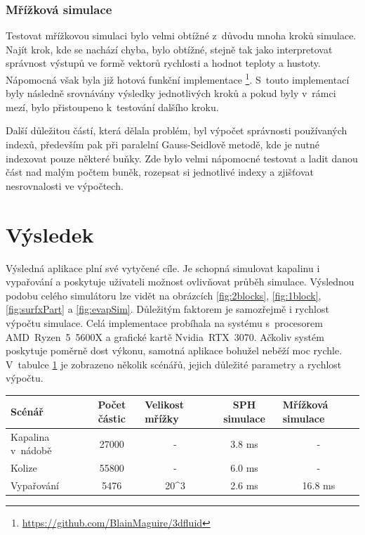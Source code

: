 \subsubsection{Mřížková simulace}
Testovat mřížkovou simulaci bylo velmi obtížné z~důvodu mnoha kroků simulace. Najít krok, kde se nachází chyba, bylo obtížné, stejně tak jako interpretovat správnost výstupů ve formě vektorů rychlosti a hodnot teploty a hustoty. Nápomocná však byla již hotová funkční implementace \footnote{\url{https://github.com/BlainMaguire/3dfluid}}. S~touto implementací byly následně srovnávány výsledky jednotlivých kroků a pokud byly v~rámci mezí, bylo přistoupeno k~testování dalšího kroku.

Další důležitou částí, která dělala problém, byl výpočet správnosti používaných indexů, především pak při paralelní Gauss-Seidlově metodě, kde je nutné indexovat pouze některé buňky. Zde bylo velmi nápomocné testovat a ladit danou část nad malým počtem buněk, rozepsat si jednotlivé indexy a zjišťovat nesrovnalosti ve výpočtech.

\section{Výsledek}
\label{chapter:vysledek}

Výsledná aplikace plní své vytyčené cíle. Je schopná simulovat kapalinu i vypařování a poskytuje uživateli možnost ovlivňovat průběh simulace. Výslednou podobu celého simulátoru lze vidět na obrázcích \ref{fig:2blocks}, \ref{fig:1block}, \ref{fig:surfxPart} a \ref{fig:evapSim}. Důležitým faktorem je samozřejmě i rychlost výpočtu simulace. Celá implementace probíhala na systému s~procesorem AMD~Ryzen~5~5600X a grafické kartě Nvidia~RTX~3070. Ačkoliv systém poskytuje poměrně dost výkonu, samotná aplikace bohužel neběží moc rychle. V~tabulce \ref{tab:times} je zobrazeno několik scénářů, jejich důležité parametry a rychlost výpočtu.

\begin{table}[h]
	\captionsetup{justification=centering}
        \begin{tabular}{l|c|c|c|c}
            Scénář            & Počet částic & \multicolumn{1}{l|}{Velikost mřížky} & SPH simulace & \multicolumn{1}{l}{Mřížková simulace} \\ \hline
            Kapalina v~nádobě & 27000        & -                                    & 3.8 ms       & -                                     \\
            Kolize            & 55800        & -                                    & 6.0 ms       & -                                     \\
            Vypařování        & 5476         & 20^3                                   & 2.6 ms       & 16.8 ms                              
        \end{tabular}
    \label{tab:times}
\end{table}

